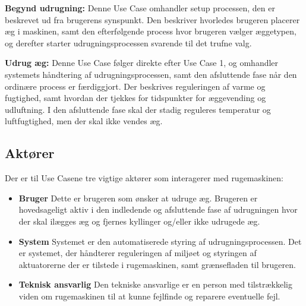 \textbf{Begynd udrugning:}
Denne Use Case omhandler setup processen, den er beskrevet ud fra brugerens synspunkt. Den beskriver hvorledes brugeren placerer æg i maskinen, samt den efterfølgende process hvor brugeren vælger æggetypen, og derefter starter udrugningsprocessen svarende til det trufne valg.\newline

\textbf{Udrug æg:}
Denne Use Case følger direkte efter Use Case 1, og omhandler systemets håndtering af udrugningsprocessen, samt den afsluttende fase når den ordinære process er færdiggjort. Der beskrives reguleringen af varme og fugtighed, samt hvordan der tjekkes for tidspunkter for æggevending og udluftning. I den afsluttende fase skal der stadig reguleres temperatur og luftfugtighed, men der skal ikke vendes æg.

\subsection{Aktører}
Der er til Use Casene tre vigtige aktører som interagerer med rugemaskinen:
\begin{itemize}
	\item \textbf{Bruger} \newline
	Dette er brugeren som ønsker at udruge æg. Brugeren er hovedsageligt aktiv i den indledende og afsluttende fase af udrugningen hvor der skal ilægges æg og fjernes kyllinger og/eller ikke udrugede æg.
	\item \textbf{System} \newline
	Systemet er den automatiserede styring af udrugningsprocessen. Det er systemet, der håndterer reguleringen af miljøet og styringen af aktuatorerne der er tilstede i rugemaskinen, samt grænsefladen til brugeren.
	\item \textbf{Teknisk ansvarlig} \newline
	Den tekniske ansvarlige er en person med tilstrækkelig viden om rugemaskinen til at kunne fejlfinde og reparere eventuelle fejl.
	\end{itemize}



